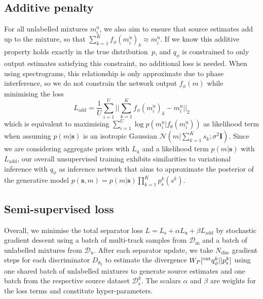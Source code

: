 \documentclass{article}
\begin{document}
\subsection{Additive penalty}
\label{sec:additive_penalty}

For all unlabelled mixtures $m^{\text{u}}_i$, we also aim to ensure that source estimates add up to the mixture, so that $\sum_{k=1}^K f_{\phi}(m^{\text{u}}_i)_k \approx m^{\text{u}}_i$. 
If we know this additive property holds exactly in the true distribution~$p$, and $q_{\phi}$ is constrained to only output estimates satisfying this constraint, no  additional loss is needed.
When using spectrograms, this relationship is only approximate due to phase interference, so we do not constrain the network output $f_{\phi}(m)$ while minimising the loss
\begin{equation}
L_{\text{add}} = \frac{1}{U} \sum_{i=1}^{U} || \sum_{k=1}^K f_{\phi}(m^{\text{u}}_i)_k - m^{\text{u}}_i ||_2
\end{equation}
which is equivalent to maximising $\sum_{i=1}^U \log p(m^{\text{u}}_i|f_{\theta}(m^{\text{u}}_i))$ as likelihood term when assuming $p(m|\mathbf{s})$ is an isotropic Gaussian $\mathcal{N}(m|\sum_{k=1}^K s_k ; \sigma^2 \mathbf{I})$.
Since we are considering aggregate priors with $L_{\text{u}}$ and a likelihood term $p(m|\mathbf{s})$ with $L_{\text{add}}$, our overall unsupervised training exhibits similarities to variational inference with $q_{\phi}$ as inference network that aims to approximate the posterior of the generative model $p(\mathbf{s},m) = p(m|\mathbf{s}) \prod_{k=1}^K p^k_{\text{s}}(s^k)$.

\subsection{Semi-supervised loss}

Overall, we minimise the total separator loss $L = L_{\text{s}} + \alpha L_{\text{u}} + \beta L_{\text{add}}$ by stochastic gradient descent using a batch of multi-track samples from $\mathcal{D}_{\text{m}}$ and a batch of unlabelled mixtures from $\mathcal{D}_{\text{u}}$.
After each separator update, we take $N_{\text{disc}}$ gradient steps for each discriminator $D_{\theta_k}$ to estimate the divergence $W_P[\prescript{\text{out}}{}{q}^k_{\phi}||p^k_{\text{s}}]$ using one shared batch of unlabelled mixtures to generate source estimates and one batch from the respective source dataset $\mathcal{D}^k_{\text{s}}$.
The scalars $\alpha$ and $\beta$ are weights for the loss terms and constitute hyper-parameters.
\end{document}
